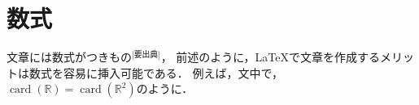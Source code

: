 \documentclass[lualatex,a4paper,ja = standard, twoside, twocolumn]{bxjsarticle}
\newtheorem{defi}{定義}[section]
\begin{document}
\section{数式}
  文章には数式がつきもの$^\text{[要出典]}$，
  前述のように，\LaTeX で文章を作成するメリットは数式を容易に挿入可能である．
  例えば，文中で，
  $\operatorname{card}(\mathbb{R}) = \operatorname{card}(\mathbb{R}^2)$のように．
\end{document}
